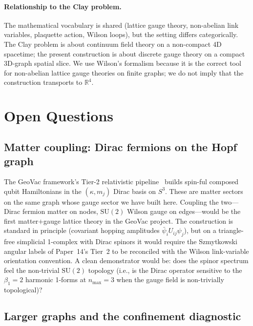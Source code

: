 \documentclass[11pt]{article}
\begin{document}
\paragraph*{Relationship to the Clay problem.}
The mathematical vocabulary is shared (lattice gauge theory,
non-abelian link variables, plaquette action, Wilson loops), but the
setting differs categorically.  The Clay problem is about continuum
field theory on a non-compact 4D spacetime; the present construction
is about discrete gauge theory on a compact 3D-graph spatial slice.
We use Wilson's formalism because it is the correct tool for
non-abelian lattice gauge theories on finite graphs; we do not
imply that the construction transports to $\mathbb{R}^4$.

\section{Open Questions}
\label{sec:open}

\subsection{Matter coupling: Dirac fermions on the Hopf graph}

The GeoVac framework's Tier-2 relativistic pipeline~\cite{paper14}
builds spin-ful composed qubit Hamiltonians in the
$(\kappa, m_j)$ Dirac basis on $S^3$.  These are matter sectors on
the same graph whose gauge sector we have built here.  Coupling the
two---Dirac fermion matter on nodes, $\mathrm{SU}(2)$ Wilson gauge on
edges---would be the first matter$+$gauge lattice theory in the
GeoVac project.  The construction is standard in principle (covariant
hopping amplitudes $\bar\psi_i U_{ij} \psi_j$), but on a
triangle-free simplicial 1-complex with Dirac spinors it would
require the Szmytkowski angular labels of Paper~14's Tier~2 to be
reconciled with the Wilson link-variable orientation convention.  A
clean demonstrator would be: does the spinor spectrum feel the
non-trivial $\mathrm{SU}(2)$ topology (i.e., is the Dirac operator
sensitive to the $\beta_1 = 2$ harmonic 1-forms at $n_{\max} = 3$ when
the gauge field is non-trivially topological)?

\subsection{Larger graphs and the confinement diagnostic}
\end{document}
